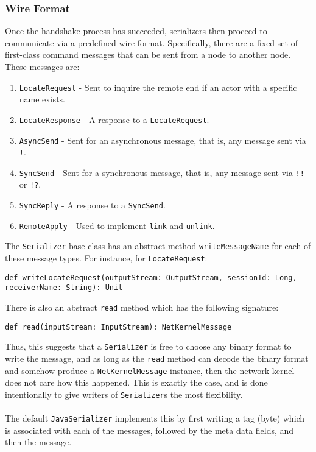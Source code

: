 \documentclass{article}
\begin{document}
\subsubsection{Wire Format}
Once the handshake process has succeeded, serializers then proceed to communicate
via a predefined wire format. Specifically, there are a fixed set of first-class
command messages that can be sent from a node to another node. These messages are:
\begin{enumerate}
  \item \verb|LocateRequest| - Sent to inquire the remote end if an actor with a specific
    name exists.
  \item \verb|LocateResponse| - A response to a \verb|LocateRequest|.
  \item \verb|AsyncSend| - Sent for an asynchronous message, that is, any message
    sent via \verb|!|.
  \item \verb|SyncSend| - Sent for a synchronous message, that is, any message sent
    via \verb|!!| or \verb|!?|.
  \item \verb|SyncReply| - A response to a \verb|SyncSend|.
  \item \verb|RemoteApply| - Used to implement \verb|link| and \verb|unlink|.
\end{enumerate}
The \verb|Serializer| base class has an abstract method \verb|writeMessageName| for each 
of these message types. For instance, for \verb|LocateRequest|:
\begin{verbatim}
def writeLocateRequest(outputStream: OutputStream, sessionId: Long, receiverName: String): Unit
\end{verbatim}
There is also an abstract \verb|read| method which has the following signature:
\begin{verbatim}
def read(inputStream: InputStream): NetKernelMessage
\end{verbatim}
Thus, this suggests that a \verb|Serializer| is free to choose any binary format to write the message,
and as long as the \verb|read| method can decode the binary format and somehow produce a 
\verb|NetKernelMessage| instance, then the network kernel does not care how this happened.
This is exactly the case, and is done intentionally to give writers of \verb|Serializer|s the most
flexibility.\\ \\
The default \verb|JavaSerializer| implements this by first writing a tag (byte) which is associated
with each of the messages, followed by the meta data fields, and then the message.
\end{document}
